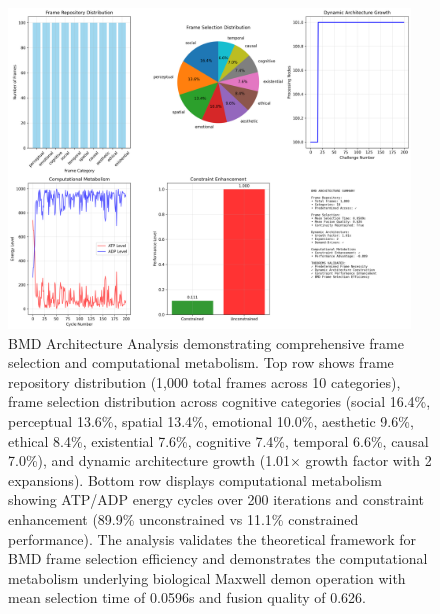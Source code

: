 
\begin{figure}[htbp]
\centering
\includegraphics[width=0.95\textwidth]{images/bmd_architecture_analysis_20250925_230459.png}
\caption{BMD Architecture Analysis demonstrating comprehensive frame selection and computational metabolism. Top row shows frame repository distribution (1,000 total frames across 10 categories), frame selection distribution across cognitive categories (social 16.4\%, perceptual 13.6\%, spatial 13.4\%, emotional 10.0\%, aesthetic 9.6\%, ethical 8.4\%, existential 7.6\%, cognitive 7.4\%, temporal 6.6\%, causal 7.0\%), and dynamic architecture growth (1.01× growth factor with 2 expansions). Bottom row displays computational metabolism showing ATP/ADP energy cycles over 200 iterations and constraint enhancement (89.9\% unconstrained vs 11.1\% constrained performance). The analysis validates the theoretical framework for BMD frame selection efficiency and demonstrates the computational metabolism underlying biological Maxwell demon operation with mean selection time of 0.0596s and fusion quality of 0.626.}
\label{fig:bmd_architecture}
\end{figure}

